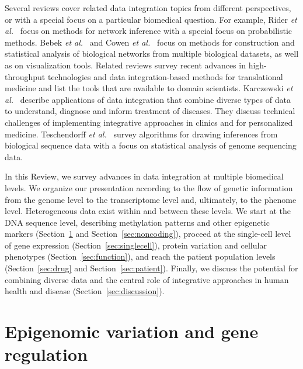 \documentclass[5p]{elsarticle}
\newcommand{\etal}{\emph{et al.}\xspace}
\newcommand{\rev}[1]{{\color{black}#1}}
\begin{document}
Several reviews cover related data integration topics from different perspectives, or with a special focus on a particular \rev{biomedical question}.
For example, Rider \etal~\cite{Rider2013review} focus on methods for network inference with a special focus on probabilistic methods.
Bebek \etal~\cite{Bebek2012review} and Cowen \etal~\cite{Cowen2017network} focus on methods for construction and statistical analysis of biological networks from multiple biological datasets, as well as on visualization tools.
Related \rev{reviews \cite{Ritchie2015methods,Kristensen2014review,Gligorijevic2016review,Malod2017precision}} survey recent advances in high-throughput technologies and data integration-based methods for translational medicine and list the tools that are available to domain scientists.
Karczewski \etal~\cite{Karczewski2018integrative} describe applications of data integration that combine diverse types of data to understand, diagnose and inform treatment of diseases.
They discuss technical challenges \rev{of implementing integrative approaches} in clinics and for personalized medicine.
Teschendorff \etal~\cite{Teschendorff2018review} \rev{survey} algorithms for drawing inferences from biological sequence data with a focus on statistical analysis of genome sequencing data.

In this Review, we survey advances in data integration at multiple \rev{biomedical levels.}
We organize our presentation according to the flow of genetic information from the genome level to the transcriptome level and, ultimately, to the phenome level.
Heterogeneous data exist within and between these levels. We start at the DNA sequence level, describing methylation patterns and other epigenetic markers (Section~\ref{sec:epigenomic} and Section~\ref{sec:noncoding}), proceed at the single-cell level of gene expression (Section~\ref{sec:singlecell}), protein variation and cellular phenotypes (Section~\ref{sec:function}), and reach the patient population levels (Section~\ref{sec:drug} and Section~\ref{sec:patient}).
Finally, we discuss the potential for combining \rev{diverse data} and the central role of integrative approaches in human health and disease (Section~\ref{sec:discussion}).


\section{Epigenomic variation and gene regulation}\label{sec:epigenomic}
\end{document}
